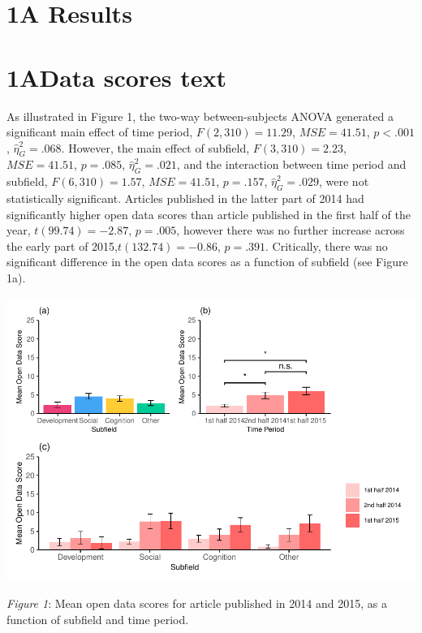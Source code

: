 \documentclass[
  english,
  man]{apa6}
\begin{document}
\hypertarget{a-results}{%
\section{1A Results}\label{a-results}}

\hypertarget{adata-scores-text}{%
\section{1AData scores text}\label{adata-scores-text}}

As illustrated in Figure 1, the two-way between-subjects ANOVA generated a significant main effect of time period, \(F(2, 310) = 11.29\), \(\mathit{MSE} = 41.51\), \(p < .001\), \(\hat{\eta}^2_G = .068\). However, the main effect of subfield, \(F(3, 310) = 2.23\), \(\mathit{MSE} = 41.51\), \(p = .085\), \(\hat{\eta}^2_G = .021\), and the interaction between time period and subfield, \(F(6, 310) = 1.57\), \(\mathit{MSE} = 41.51\), \(p = .157\), \(\hat{\eta}^2_G = .029\), were not statistically significant. Articles published in the latter part of 2014 had significantly higher open data scores than article published in the first half of the year, \(t(99.74) = -2.87\), \(p = .005\), however there was no further increase across the early part of 2015,\(t(132.74) = -0.86\), \(p = .391\). Critically, there was no significant difference in the open data scores as a function of subfield (see Figure 1a).

\includegraphics{icd_special_issue_files/figure-latex/1A-d-plots-1.pdf}

\emph{Figure 1}: Mean open data scores for article published in 2014 and 2015, as a function of subfield and time period.
\end{document}
